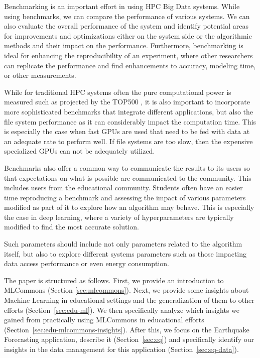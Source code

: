 \documentclass[utf8]{FrontiersinVancouver} %
\begin{document}
Benchmarking is an important effort in using HPC Big Data systems.
While using benchmarks, we can compare the performance of various
systems. We can also evaluate the overall performance of the system
and identify potential areas for improvements and optimizations either
on the system side or the algorithmic methods and their impact on the
performance. Furthermore, benchmarking is ideal for enhancing the
reproducibility of an experiment, where other researchers can
replicate the performance and find enhancements to accuracy, modeling
time, or other measurements.

While for traditional HPC systems often the pure computational power
is measured such as projected by the TOP500
\cite{dongarra1997top500,www-top500}, it is also important to
incorporate more sophisticated benchmarks that integrate different
applications, but also the file system performance as it can
considerably impact the computation time. This is especially the case
when fast GPUs are used that need to be fed with data at an adequate
rate to perform well. If file systems are too slow, then the expensive
specialized GPUs can not be adequately utilized.

Benchmarks also offer a common way to communicate the results to its
users so that expectations on what is possible are communicated to the
community. This includes users from the educational
community. Students often have an easier time reproducing a benchmark
and assessing the impact of various parameters modified as part of it
to explore how an algorithm may behave. This is especially the case in
deep learning, where a variety of hyperparameters are typically
modified to find the most accurate solution.

Such parameters should include not only parameters related to the
algorithm itself, but also to explore different systems parameters
such as those impacting data access performance or even energy
consumption.

The paper is structured as follows. First, we provide an introduction
to MLCommons (Section \ref{sec:mlcommons}).  Next, we provide some
insights about Machine Learning in educational settings and the
generalization of them to other efforts (Section~\ref{sec:edu-ml}). We
then specifically analyze which insights we gained from practically
using MLCommons in educational efforts
(Section~\ref{sec:edu-mlcommons-insights}). After this, we focus on
the Earthquake Forecasting application, describe it
(Section~\ref{sec:eq}) and specifically identify our insights in the
data management for this application (Section~\ref{sec:eq-data}).
\end{document}
